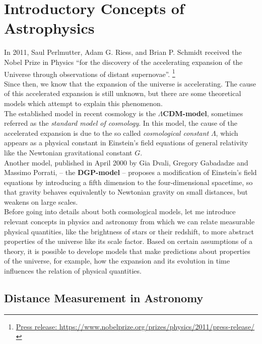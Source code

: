 \chapter{Introductory Concepts of Astrophysics}
\label{chap:introductory-concepts-of-astrophysics}
\thispagestyle{empty}

In 2011, Saul Perlmutter, Adam G. Riess, and Brian P. Schmidt received the Nobel Prize in Physics \enquote{for the discovery of the accelerating expansion of the Universe through observations of distant supernovae}. \footnote{\href{https://www.nobelprize.org/prizes/physics/2011/press-release/}{Press release: https://www.nobelprize.org/prizes/physics/2011/press-release/}} \\
Since then, we know that the expansion of the universe is accelerating.
The cause of this accelerated expansion is still unknown, but there are some theoretical models which attempt to explain this phenomenon. \\

\noindent The established model in recent cosmology is the \textbf{$\Lambda$CDM-model}, sometimes referred as the \textit{standard model of cosmology}.
In this model, the cause of the accelerated expansion is due to the so called \textit{cosmological constant} $\Lambda$, which appears as a physical constant in Einstein's field equations of general relativity like the Newtonian gravitational constant $G$. \\

\noindent Another model, published in April 2000 by Gia Dvali, Gregory Gabadadze and Massimo Porrati, -- the \textbf{DGP-model} -- proposes a modification of Einstein's field equations by introducing a fifth dimension to the four-dimensional spacetime, so that gravity behaves equivalently to Newtonian gravity on small distances, but weakens on large scales. \\


\noindent Before going into details about both cosmological models, let me introduce relevant concepts in physics and astronomy from which we can relate measurable physical quantities, like the brightness of stars or their redshift, to more abstract properties of the universe like its scale factor. Based on certain assumptions of a theory, it is possible to develope models that make predictions about properties of the universe, for example, how the expansion and its evolution in time influences the relation of physical quantities.



\section{Distance Measurement in Astronomy}

